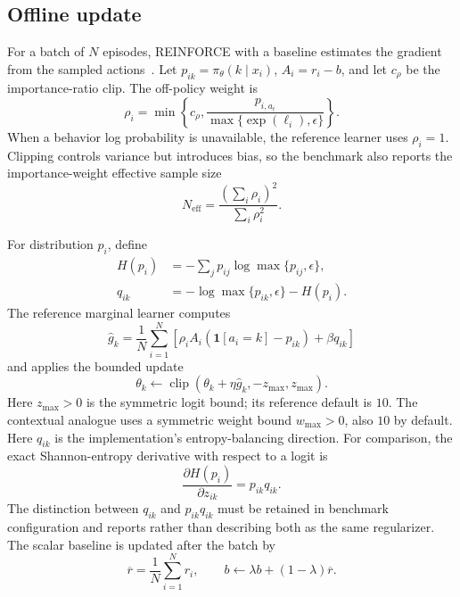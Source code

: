 \documentclass[conference]{IEEEtran}
\begin{document}
\subsection{Offline update}

For a batch of $N$ episodes, REINFORCE with a baseline estimates the
gradient from the sampled actions~\cite{williams1992simple,
sutton2018reinforcement}. Let $p_{ik}=\pi_\theta(k\mid x_i)$,
$A_i=r_i-b$, and let $c_\rho$ be the importance-ratio clip. The
off-policy weight is
\begin{equation}
\rho_i=\min\left\{c_\rho,
\frac{p_{i,a_i}}{\max\{\exp(\ell_i),\epsilon\}}\right\}.
\label{eq:importance}
\end{equation}
When a behavior log probability is unavailable, the reference learner
uses $\rho_i=1$. Clipping controls variance but introduces bias, so
the benchmark also reports the importance-weight effective sample
size
\begin{equation}
N_{\mathrm{eff}}=\frac{\left(\sum_i\rho_i\right)^2}
{\sum_i\rho_i^2}.
\label{eq:ess}
\end{equation}

For distribution $p_i$, define
\begin{equation}
\begin{aligned}
H(p_i)&=-\sum_jp_{ij}\log\max\{p_{ij},\epsilon\},\\
q_{ik}&=-\log\max\{p_{ik},\epsilon\}-H(p_i).
\end{aligned}
\label{eq:entropy-direction}
\end{equation}
The reference marginal learner computes
\begin{equation}
\widehat{g}_k=\frac{1}{N}\sum_{i=1}^{N}
\left[\rho_iA_i(\mathbf{1}[a_i=k]-p_{ik})+\beta q_{ik}\right]
\label{eq:gradient}
\end{equation}
and applies the bounded update
\begin{equation}
\theta_k\leftarrow\operatorname{clip}
(\theta_k+\eta\widehat{g}_k,-z_{\max},z_{\max}).
\label{eq:bounded-update}
\end{equation}
Here $z_{\max}>0$ is the symmetric logit bound; its reference default
is $10$. The contextual analogue uses a symmetric weight bound
$w_{\max}>0$, also $10$ by default.
Here $q_{ik}$ is the implementation's entropy-balancing direction.
For comparison, the exact Shannon-entropy derivative with respect to
a logit is
\begin{equation}
\frac{\partial H(p_i)}{\partial z_{ik}}=p_{ik}q_{ik}.
\label{eq:entropy-gradient}
\end{equation}
The distinction between $q_{ik}$ and $p_{ik}q_{ik}$ must be retained
in benchmark configuration and reports rather than describing both
as the same regularizer. The scalar baseline is updated after the
batch by
\begin{equation}
\overline{r}=\frac{1}{N}\sum_{i=1}^{N}r_i,\qquad
b\leftarrow\lambda b+(1-\lambda)\overline{r}.
\label{eq:baseline}
\end{equation}
\end{document}
